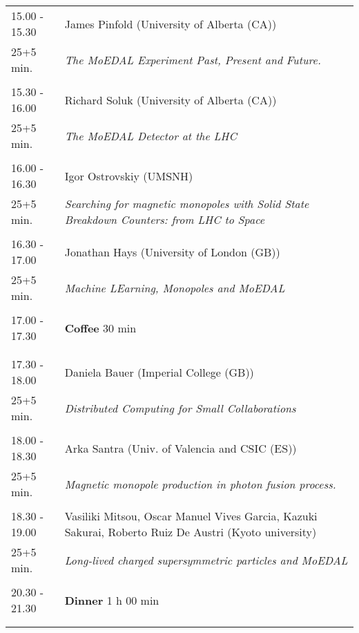 \begin{longtable}{p{3cm}p{13cm}}
15.00 - 15.30 & James Pinfold (University of Alberta (CA))\\ 
25+5 min. & {\it The MoEDAL Experiment Past, Present and Future.}\\ 
 & \\ 
15.30 - 16.00 & Richard Soluk (University of Alberta (CA))\\ 
25+5 min. & {\it The MoEDAL Detector at the LHC}\\ 
 & \\ 
16.00 - 16.30 & Igor Ostrovskiy (UMSNH)\\ 
25+5 min. & {\it Searching for magnetic monopoles with Solid State Breakdown Counters: from LHC to Space}\\ 
 & \\ 
16.30 - 17.00 & Jonathan Hays (University of London (GB))\\ 
25+5 min. & {\it Machine LEarning, Monopoles and MoEDAL}\\ 
 & \\ 
17.00 - 17.30 & {\bf Coffee} \hfill 30 min \\ 
 & \\ 
 & \\ 
17.30 - 18.00 & Daniela Bauer (Imperial College (GB))\\ 
25+5 min. & {\it Distributed Computing for Small Collaborations}\\ 
 & \\ 
18.00 - 18.30 & Arka Santra (Univ. of Valencia and CSIC (ES))\\ 
25+5 min. & {\it Magnetic monopole production in photon fusion process.}\\ 
 & \\ 
18.30 - 19.00 & Vasiliki Mitsou, Oscar Manuel Vives Garcia, Kazuki Sakurai, Roberto Ruiz De Austri (Kyoto university)\\ 
25+5 min. & {\it Long-lived charged supersymmetric particles and MoEDAL}\\ 
 & \\ 
20.30 - 21.30 & {\bf Dinner} \hfill 1 h 00 min \\ 
 & \\ 
 & \\ 
\end{longtable}

